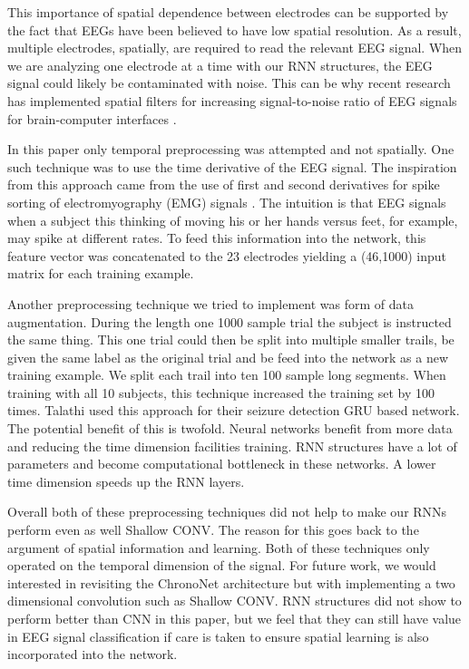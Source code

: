 \documentclass[10pt,twocolumn,letterpaper]{article}
\begin{document}
This importance of spatial dependence between electrodes can be supported by the fact that EEGs have been believed to have low spatial resolution. As a result, multiple electrodes, spatially, are required to read the relevant EEG signal. When we are analyzing one electrode at a time with our RNN structures, the EEG signal could likely be contaminated with noise. This can be why recent research has implemented spatial filters for increasing signal-to-noise ratio of EEG signals for brain-computer interfaces \cite{DBLP:journals/corr/WuKCLJ17}.

In this paper only temporal preprocessing was attempted and not spatially. One such technique was to use the time derivative of the EEG signal. The inspiration from this approach came from the use of first and second derivatives for spike sorting of electromyography (EMG) signals \cite{EMG}. The intuition is that EEG signals when a subject this thinking of moving his or her hands versus feet, for example, may spike at different rates. To feed this information into the network, this feature vector was concatenated to the 23 electrodes yielding a (46,1000) input matrix for each training example.

Another preprocessing technique we tried to implement was form of data augmentation. During the length one 1000 sample trial the subject is instructed the same thing.  This one trial could then be split into multiple smaller trails, be given the same label as the original trial and be feed into the network as a new training example. We split each trail into ten 100 sample long segments. When training with all 10 subjects, this technique increased the training set by 100 times. Talathi \cite{Deep} used this approach for their seizure detection GRU based network. The potential benefit of this is twofold. Neural networks benefit from more data and reducing the time dimension facilities training. RNN structures have a lot of parameters and become computational bottleneck in these networks. A lower time dimension speeds up the RNN layers.

Overall both of these preprocessing techniques did not help to make our RNNs perform even as well Shallow CONV. The reason for this goes back to the argument of spatial information and learning. Both of these techniques only operated on the temporal dimension of the signal. For future work, we would interested in revisiting the ChronoNet architecture but with implementing a two dimensional convolution such as Shallow CONV. RNN structures did not show to perform better than CNN in this paper, but we feel that they can still have value in EEG signal classification if care is taken to ensure spatial learning is also incorporated into the network.
\clearpage
\newpage
{\small


}
\end{document}
